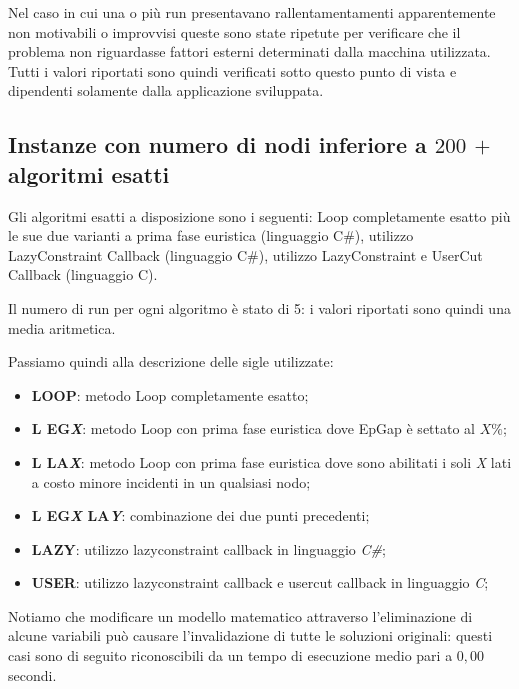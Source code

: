 \documentclass[11pt]{article}
\begin{document}
Nel caso in cui una o più run presentavano rallentamentamenti apparentemente non motivabili o improvvisi queste sono state ripetute per verificare che il problema non riguardasse fattori esterni determinati dalla macchina utilizzata. Tutti i valori riportati sono quindi verificati sotto questo punto di vista e dipendenti solamente dalla applicazione sviluppata.

\subsection*{Instanze con numero di nodi inferiore a \textbf{$200$} $+$ algoritmi esatti}

Gli algoritmi esatti a disposizione sono i seguenti: Loop completamente esatto più le sue due varianti a prima fase euristica (linguaggio C\#), utilizzo LazyConstraint Callback (linguaggio C\#), utilizzo LazyConstraint e UserCut Callback (linguaggio C).

Il numero di run per ogni algoritmo è stato di 5: i valori riportati sono quindi una media aritmetica.

Passiamo quindi alla descrizione delle sigle utilizzate:
\begin{itemize}
    \item \textbf{LOOP}: metodo Loop completamente esatto;
    \item \textbf{L EG\textit{X}}: metodo Loop con prima fase euristica dove EpGap è settato al $X\%$;
    \item \textbf{L LA\textit{X}}: metodo Loop con prima fase euristica dove sono abilitati i soli \textit{X} lati a costo minore incidenti in un qualsiasi nodo;
    \item \textbf{L EG\textit{X} LA\textit{Y}}: combinazione dei due punti precedenti;
    \item \textbf{LAZY}: utilizzo lazyconstraint callback in linguaggio\textit{ C\#};
    \item \textbf{USER}: utilizzo lazyconstraint callback e usercut callback in linguaggio \textit{C};
\end{itemize}

Notiamo che modificare un modello matematico attraverso l'eliminazione di alcune variabili può causare l'invalidazione di tutte le soluzioni originali: questi casi sono di seguito riconoscibili da un tempo di esecuzione medio pari a $0,00$ secondi.

\newpage
\end{document}
